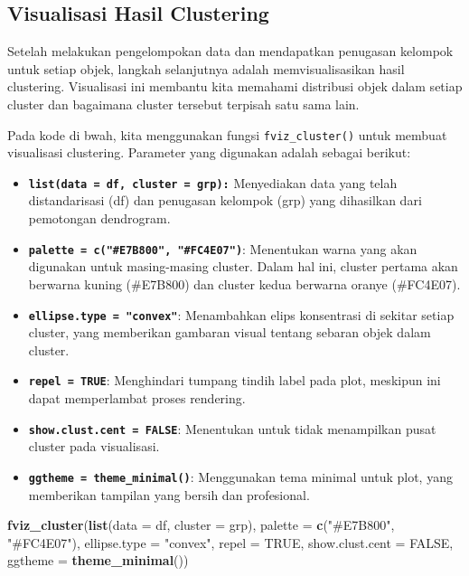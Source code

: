 \documentclass[
  oneside]{book}
\newenvironment{Shaded}{\begin{snugshade}}{\end{snugshade}}
\newcommand{\AttributeTok}[1]{\textcolor[rgb]{0.13,0.29,0.53}{#1}}
\newcommand{\ConstantTok}[1]{\textcolor[rgb]{0.56,0.35,0.01}{#1}}
\newcommand{\FunctionTok}[1]{\textcolor[rgb]{0.13,0.29,0.53}{\textbf{#1}}}
\newcommand{\NormalTok}[1]{#1}
\newcommand{\StringTok}[1]{\textcolor[rgb]{0.31,0.60,0.02}{#1}}
\begin{document}
\subsection*{Visualisasi Hasil Clustering}\label{visualisasi-hasil-clustering-1}

Setelah melakukan pengelompokan data dan mendapatkan penugasan kelompok untuk setiap objek, langkah selanjutnya adalah memvisualisasikan hasil clustering. Visualisasi ini membantu kita memahami distribusi objek dalam setiap cluster dan bagaimana cluster tersebut terpisah satu sama lain.

Pada kode di bwah, kita menggunakan fungsi \texttt{fviz\_cluster()} untuk membuat visualisasi clustering. Parameter yang digunakan adalah sebagai berikut:

\begin{itemize}
\item
  \textbf{\texttt{list(data\ =\ df,\ cluster\ =\ grp):}} Menyediakan data yang telah distandarisasi (df) dan penugasan kelompok (grp) yang dihasilkan dari pemotongan dendrogram.
\item
  \textbf{\texttt{palette\ =\ c("\#E7B800",\ "\#FC4E07")}}: Menentukan warna yang akan digunakan untuk masing-masing cluster. Dalam hal ini, cluster pertama akan berwarna kuning (\#E7B800) dan cluster kedua berwarna oranye (\#FC4E07).
\item
  \textbf{\texttt{ellipse.type\ =\ "convex"}}: Menambahkan elips konsentrasi di sekitar setiap cluster, yang memberikan gambaran visual tentang sebaran objek dalam cluster.
\item
  \textbf{\texttt{repel\ =\ TRUE}}: Menghindari tumpang tindih label pada plot, meskipun ini dapat memperlambat proses rendering.
\item
  \textbf{\texttt{show.clust.cent\ =\ FALSE}}: Menentukan untuk tidak menampilkan pusat cluster pada visualisasi.
\item
  \textbf{\texttt{ggtheme\ =\ theme\_minimal()}}: Menggunakan tema minimal untuk plot, yang memberikan tampilan yang bersih dan profesional.
\end{itemize}

\begin{Shaded}
\begin{Highlighting}[]
\FunctionTok{fviz\_cluster}\NormalTok{(}\FunctionTok{list}\NormalTok{(}\AttributeTok{data =}\NormalTok{ df, }\AttributeTok{cluster =}\NormalTok{ grp),}
\AttributeTok{palette =} \FunctionTok{c}\NormalTok{(}\StringTok{"\#E7B800"}\NormalTok{, }\StringTok{"\#FC4E07"}\NormalTok{),}
\AttributeTok{ellipse.type =} \StringTok{"convex"}\NormalTok{,}
\AttributeTok{repel =} \ConstantTok{TRUE}\NormalTok{, }
\AttributeTok{show.clust.cent =} \ConstantTok{FALSE}\NormalTok{, }\AttributeTok{ggtheme =} \FunctionTok{theme\_minimal}\NormalTok{())}
\end{Highlighting}
\end{Shaded}
\end{document}
